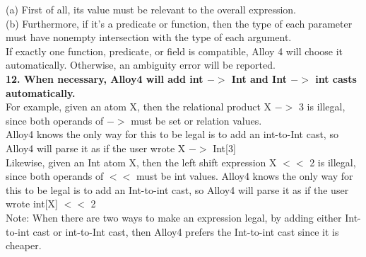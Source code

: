 \documentclass[a4paper,12pt]{extarticle}
\begin{document}
(a) First of all, its value must be relevant to the overall expression. \\
(b) Furthermore, if it's a predicate or function, then the type of each parameter must have nonempty intersection with the type of each argument. \\
If exactly one function, predicate, or field is compatible, Alloy 4 will choose it automatically. Otherwise, an ambiguity error will be reported. \\
\textbf{12. When necessary, Alloy4 will add int $->$ Int and Int $->$ int casts automatically. } \\
For example, given an atom X, then the relational product X $->$ 3 is illegal,\\
since both operands of $->$ must be set or relation values.\\
Alloy4 knows the only way for this to be legal is to add an int-to-Int cast,
so Alloy4 will parse it as if the user wrote X $->$ Int[3] \\
  Likewise, given an Int atom X, then the left shift expression X $<<$ 2 is illegal,
since both operands of $<<$ must be int values.
Alloy4 knows the only way for this to be legal is to add an Int-to-int cast,
so Alloy4 will parse it as if the user wrote int[X] $<<$ 2 \\

  Note: When there are two ways to make an expression legal,
by adding either Int-to-int cast or int-to-Int cast,
then Alloy4 prefers the Int-to-int cast since it is cheaper. \\
\end{document}
